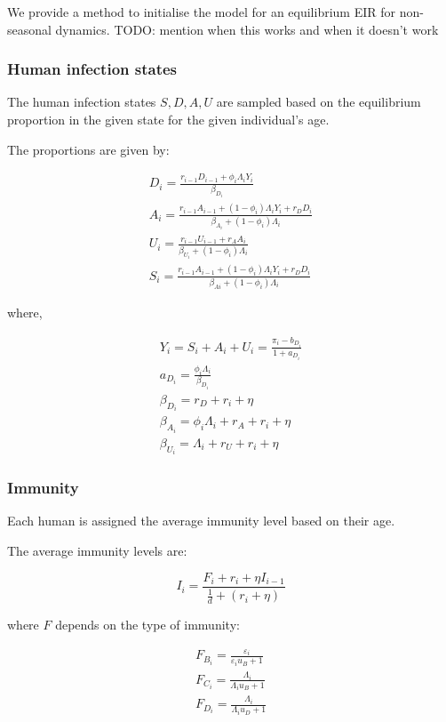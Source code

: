 \documentclass{bmcart}
\begin{document}
\begin{backmatter}
We provide a method to initialise the model for an equilibrium EIR for non-seasonal dynamics. TODO: mention when this works and when it doesn't work

\subsubsection*{Human infection states}

The human infection states ${S, D, A, U}$ are sampled based on the equilibrium proportion in the given state for the given individual's age.

The proportions are given by:

\begin{gather*}
    D_i = \frac{r_{i-1}D_{i-1} + \phi_i\Lambda_iY_i}{\beta_{D_i}} \\
    A_i = \frac{r_{i-1}A_{i-1} + (1-\phi_i)\Lambda_iY_i + r_DD_i}{\beta_{A_i} + (1-\phi_i)\Lambda_i} \\
    U_i = \frac{r_{i-1}U_{i-1} + r_{A}A_{i}}{\beta_{U_i} + (1-\phi_i)\Lambda_i} \\
    S_i = \frac{r_{i-1}A_{i-1} + (1-\phi_i)\Lambda_iY_i + r_DD_i}{\beta_{Ai} + (1-\phi_i)\Lambda_i}
\end{gather*}

where,

\begin{gather*}
    Y_i = S_i + A_i + U_i = \frac{\pi_i - b_{D_i}}{1 + a_{D_i}} \\
    a_{D_i} = \frac{\phi_i\Lambda_i}{\beta_{D_i}} \\
    \beta_{D_i} = r_D + r_i + \eta \\
    \beta_{A_i} = \phi_i\Lambda_i + r_A + r_i + \eta \\
    \beta_{U_i} = \Lambda_i + r_U + r_i + \eta
\end{gather*}

\subsubsection*{Immunity}

Each human is assigned the average immunity level based on their age.

The average immunity levels are:

\[ I_i = \frac{F_i + r_i + \eta I_{i-1}}{\frac{1}{d} +(r_i + \eta)} \]

where $F$ depends on the type of immunity:

\begin{gather*}
    F_{B_i} = \frac{\varepsilon_i}{\varepsilon_i u_B + 1} \\
    F_{C_i} = \frac{\Lambda_i}{\Lambda_i u_B + 1} \\
    F_{D_i} = \frac{\Lambda_i}{\Lambda_i u_D + 1}
\end{gather*}


\end{backmatter}
\end{document}
